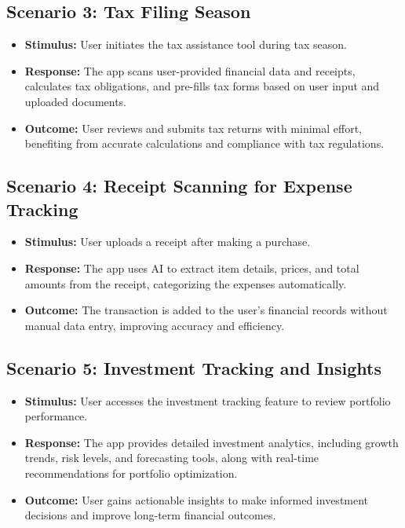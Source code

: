 \subsection*{Scenario 3: Tax Filing Season}
\begin{itemize}
    \item \textbf{Stimulus:} User initiates the tax assistance tool during tax season.
    \item \textbf{Response:} The app scans user-provided financial data and receipts, calculates tax obligations, and pre-fills tax forms based on user input and uploaded documents.
    \item \textbf{Outcome:} User reviews and submits tax returns with minimal effort, benefiting from accurate calculations and compliance with tax regulations.
\end{itemize}

\subsection*{Scenario 4: Receipt Scanning for Expense Tracking}
\begin{itemize}
    \item \textbf{Stimulus:} User uploads a receipt after making a purchase.
    \item \textbf{Response:} The app uses AI to extract item details, prices, and total amounts from the receipt, categorizing the expenses automatically.
    \item \textbf{Outcome:} The transaction is added to the user's financial records without manual data entry, improving accuracy and efficiency.
\end{itemize}

\subsection*{Scenario 5: Investment Tracking and Insights}
\begin{itemize}
    \item \textbf{Stimulus:} User accesses the investment tracking feature to review portfolio performance.
    \item \textbf{Response:} The app provides detailed investment analytics, including growth trends, risk levels, and forecasting tools, along with real-time recommendations for portfolio optimization.
    \item \textbf{Outcome:} User gains actionable insights to make informed investment decisions and improve long-term financial outcomes.
\end{itemize}
